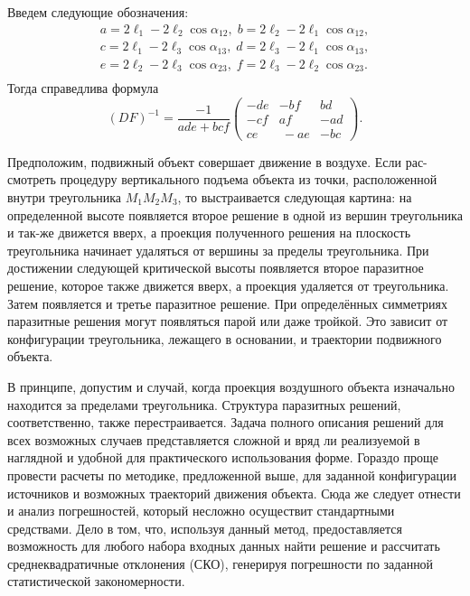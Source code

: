 \documentclass[../main.tex]{subfiles}
\begin{document}
Введем следующие обозначения:
\begin {equation}
  \begin {matrix}
   a= 2\ell_1 - 2\ell_2 \cos \alpha_{12}, \; b= 2\ell_2 - 2\ell_1 \cos \alpha_{12}, \\
   c= 2\ell_1 - 2\ell_3 \cos \alpha_{13}, \; d= 2\ell_3 - 2\ell_1 \cos \alpha_{13}, \\
   e= 2\ell_2 - 2\ell_3 \cos \alpha_{23}, \; f= 2\ell_3 - 2\ell_2 \cos \alpha_{23}. \\
  \end {matrix}
  \label {abc}
\end {equation}
Тогда справедлива формула
\begin{equation}
  (DF)^{-1} = \frac {-1} {ade+bcf}
  \left(
    \begin{array}{ccc}
      -de & -bf & bd \\
      -cf &  af & -ad \\
      ce  &\ -ae & -bc
    \end{array}
  \right) .
\label {DF_m1}
\end{equation}

Предположим, подвижный объект совершает движение в воздухе. Если рас-смотреть процедуру вертикального подъема объекта из точки, расположенной внутри треугольника $M_1 M_2 M_3$, то выстраивается следующая картина: на определенной высоте появляется второе решение в одной из вершин треугольника и так-же движется вверх, а проекция полученного решения на плоскость треугольника начинает удаляться от вершины за пределы треугольника. При достижении следующей критической высоты появляется второе паразитное решение, которое также движется вверх, а проекция удаляется от треугольника. Затем появляется и третье паразитное решение. При определённых симметриях паразитные решения могут появляться парой или даже тройкой. Это зависит от конфигурации треугольника, лежащего в основании, и траектории подвижного объекта.

В принципе, допустим и случай, когда проекция воздушного объекта изначально находится за пределами треугольника. Структура паразитных решений, соответственно, также перестраивается. Задача полного описания решений для всех возможных случаев представляется сложной и вряд ли реализуемой в наглядной и удобной для практического использования форме. Гораздо проще провести расчеты по методике, предложенной выше, для заданной конфигурации источников и возможных траекторий движения объекта. Сюда же следует отнести и анализ погрешностей, который несложно осуществит стандартными средствами. Дело в том, что, используя данный метод, предоставляется возможность для любого набора входных данных найти решение и рассчитать среднеквадратичные отклонения (СКО), генерируя погрешности по заданной статистической закономерности.
\end{document}

